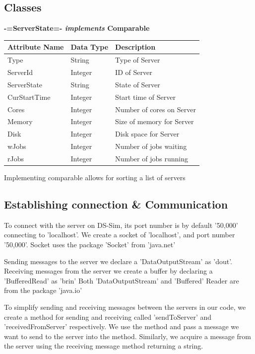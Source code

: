 \documentclass[a4paper]{article} %
\begin{document}
\subsection*{Classes}
\textbf{-=ServerState=- \textit{implements} Comparable}
\begin{flushleft}
    \begin{tabular}{|l|l|l|}
        \hline
        \textbf{Attribute Name} & \textbf{Data Type} & \textbf{Description} \\
        \hline
        Type & String & Type of Server \\
        \hline
        ServerId & Integer & ID of Server\\
        \hline
        ServerState & String & State of Server\\
        \hline
        CurStartTime & Integer & Start time of Server\\
        \hline
        Cores & Integer & Number of cores on Server\\
        \hline
        Memory & Integer & Size of memory for Server\\
        \hline
        Disk & Integer & Disk space for Server\\
        \hline
        wJobs & Integer & Number of jobs waiting\\
        \hline
        rJobs & Integer & Number of jobs running\\
        \hline
    \end{tabular}
\end{flushleft}

Implementing comparable allows for sorting a list of servers

\subsection{Establishing connection & Communication}
To connect with the server on DS-Sim, its port number is by default '50,000' connecting to 'localhost'.
We create a socket of 'localhost', and port number '50,000'. Socket uses the package 'Socket' from 'java.net'

\medskip
Sending messages to the server we declare a 'DataOutputStream' as 'dout'.
Receiving messages from the server we create a buffer by declaring a 'BufferedRead' as 'brin'
Both 'DataOutputStream' and 'Buffered' Reader are from the package 'java.io'

\medskip
To simplify sending and receiving messages between the servers in our code, we create a method for sending and receiving called 'sendToServer' and 'receivedFromServer' respectively. We use the method and pass a message we want to send to the server into the method. Similarly, we acquire a message from the server using the receiving message method returning a string.
\end{document}
